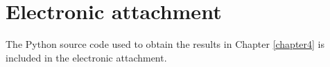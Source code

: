 \documentclass[12pt,a4paper]{report}
\let\openright=\clearpage
\begin{document}
\begin{center}
\begin{table}[H]
\centering
{}
\caption{Specification of which stock tickers belong to which asset set.}
\label{table:asset_sets}
\end{table}
\end{center}

\section{Electronic attachment}
The Python source code used to obtain the results in Chapter \ref{chapter4} is included in the electronic attachment.
\openright
\end{document}
